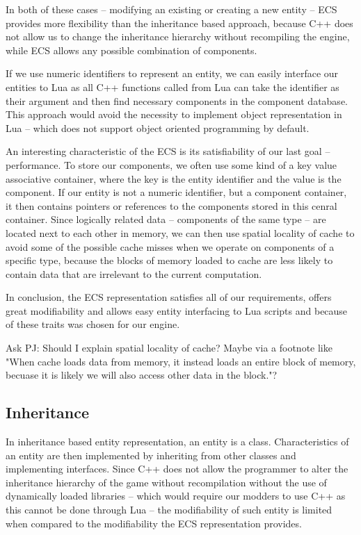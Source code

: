 In both of these cases -- modifying an existing or creating a new entity -- ECS provides more flexibility than the inheritance
based approach, because C++ does not allow us to change the inheritance hierarchy without recompiling the engine, while
ECS allows any possible combination of components.

If we use numeric identifiers to represent an entity, we can easily interface our entities to Lua as all C++ functions
called from Lua can take the identifier as their argument and then find necessary components in the component database.
This approach would avoid the necessity to implement object representation in Lua -- which does not support object oriented
programming by default.

An interesting characteristic of the ECS is its satisfiability of our last goal -- performance. To store our components,
we often use some kind of a key value associative container, where the key is the entity identifier and the value is the component.
If our entity is not a numeric identifier, but a component container, it then contains pointers or references to the components
stored in this cenral container. Since logically related data -- components of the same type -- are located next to each other
in memory, we can then use spatial locality of cache to avoid some of the possible cache misses when we operate on components of a specific
type, because the blocks of memory loaded to cache are less likely to contain data that are irrelevant to the current computation.

In conclusion, the ECS representation satisfies all of our requirements, offers great modifiability and allows easy entity
interfacing to Lua scripts and because of these traits was chosen for our engine.

\bigskip
Ask PJ: Should I explain spatial locality of cache? Maybe via a footnote like "When cache loads data from memory, it instead
loads an entire block of memory, becuase it is likely we will also access other data in the block."?

\subsection{Inheritance}

In inheritance based entity representation, an entity is a class. Characteristics of an entity are then implemented by inheriting
from other classes and implementing interfaces. Since C++ does not allow the programmer to alter the inheritance hierarchy of the game
without recompilation without the use of dynamically loaded libraries -- which would require our modders to use C++ as this cannot
be done through Lua -- the modifiability of such entity is limited when compared to the modifiability the ECS representation provides.

